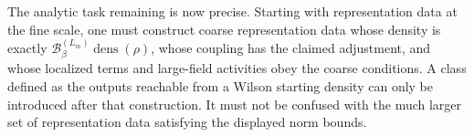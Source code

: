The analytic task remaining is now precise. Starting with representation data at the
fine scale, one must construct coarse representation data whose density is exactly
$\mathcal B^{(L_m)}_\beta\operatorname{dens}(\rho)$, whose coupling has the
claimed adjustment, and whose localized terms and large-field activities obey the coarse conditions.
A class defined as the outputs reachable from a Wilson starting density
can only be introduced after that construction. It must not be confused
with the much larger set of representation data satisfying the displayed
norm bounds.
